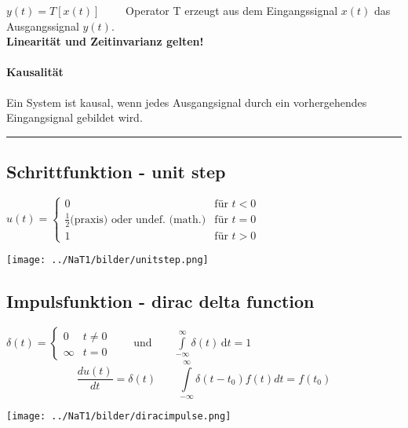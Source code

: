 \begin{center}
	
\end{center}

$ y(t) = T [ x(t)] \qquad $ Operator T erzeugt aus dem Eingangssignal $ x(t) $ das Ausgangssignal $ y(t)$. \\
\textbf{Linearität und Zeitinvarianz gelten!}

\paragraph{Kausalität} Ein System ist kausal, wenn jedes Ausgangsignal durch ein vorhergehendes Eingangsignal gebildet wird.
\\
\hrule
\subsection{Schrittfunktion - unit step}
\begin{minipage}{10cm}
	$u(t) =	\begin{cases}
	  		 0 & \text{für } t < 0 \\
	  		 \frac{1}{2} \text{(praxis)}  \text{ oder undef. (math.)} & \text{für } t = 0 \\
	  		 1 & \text{für } t > 0
	  	\end{cases}
	$
\end{minipage}
\begin{minipage}{8cm}
	\texttt{[image: ../NaT1/bilder/unitstep.png]}
\end{minipage}


\subsection{Impulsfunktion - dirac delta function}
	\begin{minipage}{10cm}
		$\delta (t)=\begin{cases} 0 & t\ne 0\\\infty & t=0\end{cases} \qquad
		\text{und} \qquad \int\limits_{-\infty}^\infty \delta(t) \, \mathrm dt = 1 $\\
		$$\frac{du(t)}{dt}=\delta(t) \qquad
		\int\limits_{-\infty}^{\infty}\delta(t-t_0)f(t)dt=f(t_0)$$
	\end{minipage}
	\begin{minipage}{8cm}
		\texttt{[image: ../NaT1/bilder/diracimpulse.png]}
	\end{minipage}

